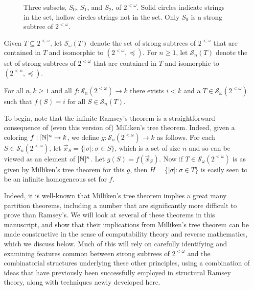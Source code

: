 \begin{figure}[h]
\caption{Three subsets, $S_0$, $S_1$, and $S_2$, of $2^{<\omega}$. Solid circles indicate strings in the set, hollow circles strings not in the set. Only $S_0$ is a strong subtree of $2^{<\omega}$.}\label{f:intro}
\end{figure}

Given $T \subseteq 2^{<\omega}$, let $\mathcal{S}_\omega(T)$ denote the set of strong subtrees of $2^{<\omega}$ that are contained in $T$ and isomorphic to $(2^{<\omega},\preceq)$. For $n \geq 1$, let $\mathcal{S}_n(T)$ denote the set of strong subtrees of $2^{<\omega}$ that are contained in $T$ and isomorphic to $(2^{< n},\preceq)$.

\begin{theorem}
	For all $n,k \geq 1$ and all $f: \mathcal{S}_n(2^{<\omega}) \to k$ there exists $i < k$ and a $T \in \mathcal{S}_\omega(2^{<\omega})$ such that $f(S) = i$ for all $S \in \mathcal{S}_n(T)$.
\end{theorem}

To begin, note that the infinite Ramsey's theorem is a straightforward consequence of (even this version of) Milliken's tree theorem. Indeed, given a coloring $f: [\mathbb{N}]^n \to k$, we define $g: \mathcal{S}_n(2^{<\omega}) \to k$ as follows. For each $S \in \mathcal{S}_n(2^{<\omega})$, let $\vec{x}_S = \{ |\sigma|: \sigma \in S\}$, which is a set of size $n$ and so can be viewed as an element of $[\mathbb{N}]^n$. Let $g(S) = f(\vec{x}_S)$. Now if $T \in \mathcal{S}_\omega(2^{<\omega})$ is as given by Milliken's tree theorem for this $g$, then $H = \{|\sigma|: \sigma \in T\}$ is easily seen to be an infinite homogeneous set for $f$.

Indeed, it is well-known that Milliken's tree theorem implies a great many partition theorems, including a number that are significantly more difficult to prove than Ramsey's. We will look at several of these theorems in this manuscript, and show that their implications from Milliken's tree theorem can be made constructive in the sense of computability theory and reverse mathematics, which we discuss below. Much of this will rely on carefully identifying and examining features common between strong subtrees of $2^{<\omega}$ and the combinatorial structures underlying these other principles, using a combination of ideas that have previously been successfully employed in structural Ramsey theory, along with techniques newly developed here.

